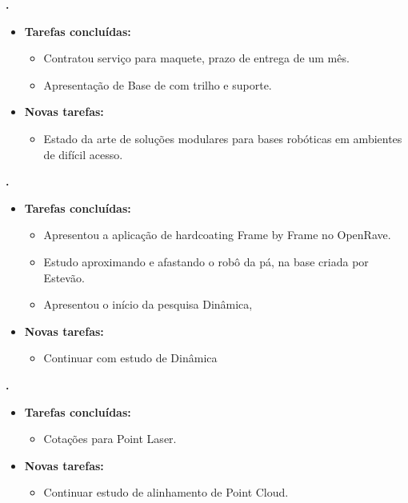 					
			
   \textbf{.} 
	\begin{itemize}
		\item \textbf{Tarefas concluídas:}
			\begin{itemize}  
			  \item Contratou serviço para maquete, prazo de entrega de um mês.
			  \item Apresentação de Base de com trilho e suporte.
			\end{itemize}
		
		\item \textbf{Novas tarefas:}
			\begin{itemize} 
				\item Estado da arte de soluções modulares para bases robóticas em ambientes de difícil acesso.
			\end{itemize}
	\end{itemize}

	  \textbf{\renan.} 
	\begin{itemize}
		\item \textbf{Tarefas concluídas:}
			\begin{itemize}    
				\item Apresentou a aplicação de hardcoating Frame by Frame no OpenRave. 
				\item Estudo aproximando e afastando o robô da pá, na base criada por
				Estevão.
				\item Apresentou o início da pesquisa Dinâmica,
			\end{itemize}
		
		\item \textbf{Novas tarefas:}
			\begin{itemize} 
			    \item Continuar com estudo de Dinâmica
			\end{itemize}
	\end{itemize}	
	
	
	  \textbf{\elael.} 
	\begin{itemize}
		\item \textbf{Tarefas concluídas:}
			\begin{itemize}    
				\item Cotações para Point Laser. 
			\end{itemize}
		
		\item \textbf{Novas tarefas:}
			\begin{itemize} 
			    \item Continuar estudo de alinhamento de Point Cloud.
			\end{itemize}
	\end{itemize}			
			
